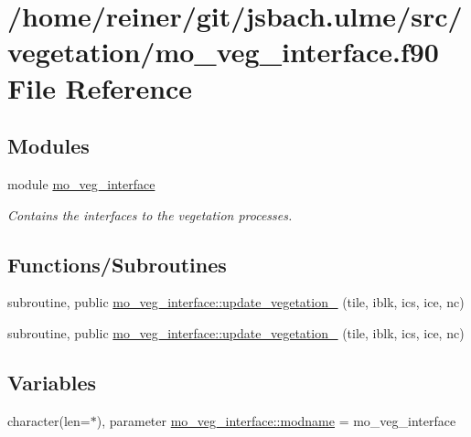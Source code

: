 \hypertarget{mo__veg__interface_8f90}{}\section{/home/reiner/git/jsbach.ulme/src/vegetation/mo\+\_\+veg\+\_\+interface.f90 File Reference}
\label{mo__veg__interface_8f90}
\subsection*{Modules}
\begin{DoxyCompactItemize}
\item 
module \hyperlink{namespacemo__veg__interface}{mo\+\_\+veg\+\_\+interface}
\begin{DoxyCompactList}\small\item\em Contains the interfaces to the vegetation processes. \end{DoxyCompactList}\end{DoxyCompactItemize}
\subsection*{Functions/\+Subroutines}
\begin{DoxyCompactItemize}
\item 
subroutine, public \hyperlink{namespacemo__veg__interface_a3663bc9118551ffb7d52763535228d89}{mo\+\_\+veg\+\_\+interface\+::update\+\_\+vegetation\+\_} (tile, iblk, ics, ice, nc)
\item 
subroutine, public \hyperlink{namespacemo__veg__interface_a58ea81b4305df127f8b495a40b520eae}{mo\+\_\+veg\+\_\+interface\+::update\+\_\+vegetation\+\_} (tile, iblk, ics, ice, nc)
\end{DoxyCompactItemize}
\subsection*{Variables}
\begin{DoxyCompactItemize}
\item 
character(len=$\ast$), parameter \hyperlink{namespacemo__veg__interface_a8187c713accfd2ec663731108d9ad611}{mo\+\_\+veg\+\_\+interface\+::modname} = \textquotesingle{}mo\+\_\+veg\+\_\+interface\textquotesingle{}
\end{DoxyCompactItemize}
